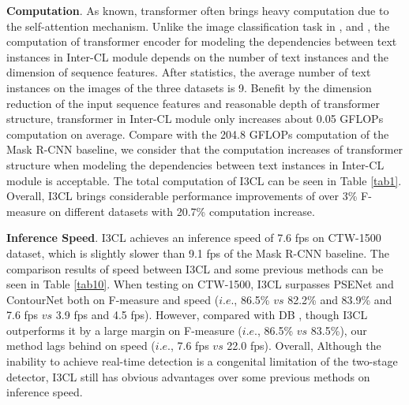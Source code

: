 \textbf{Computation}. As known, transformer often brings heavy computation due to the self-attention mechanism. Unlike the image classification task in \citep{xu2021vitae}, \citep{zhang2022vitaev2} and \citep{swin}, the computation of transformer encoder for modeling the dependencies between text instances in Inter-CL module depends on the number of text instances and the dimension of sequence features. After statistics, the average number of text instances on the images of the three datasets is 9. Benefit by the dimension reduction of the input sequence features and reasonable depth of transformer structure, transformer in Inter-CL module only increases about 0.05 GFLOPs computation on average. Compare with the 204.8 GFLOPs computation of the Mask R-CNN baseline, we consider that the computation increases of transformer structure when modeling the dependencies between text instances in Inter-CL module is acceptable. The total computation of I3CL can be seen in Table \ref{tab1}. Overall, I3CL brings considerable performance improvements of over 3\% F-measure on different datasets with 20.7\% computation increase.

\textbf{Inference Speed}. I3CL achieves an inference speed of 7.6 fps on CTW-1500 dataset, which is slightly slower than 9.1 fps of the Mask R-CNN baseline. The comparison results of speed between I3CL and some previous methods can be seen in Table \ref{tab10}. When testing on CTW-1500, I3CL surpasses PSENet \citep{psenet} and ContourNet \citep{contournet} both on F-measure and speed ($i.e.$, 86.5\% $vs$ 82.2\% and 83.9\% and 7.6 fps $vs$ 3.9 fps and 4.5 fps). However, compared with DB \citep{db}, though I3CL outperforms it by a large margin on F-measure ($i.e.$, 86.5\% $vs$ 83.5\%), our method lags behind on speed ($i.e.$, 7.6 fps $vs$ 22.0 fps). Overall, Although the inability to achieve real-time detection is a congenital limitation of the two-stage detector, I3CL still has obvious advantages over some previous methods on inference speed.

